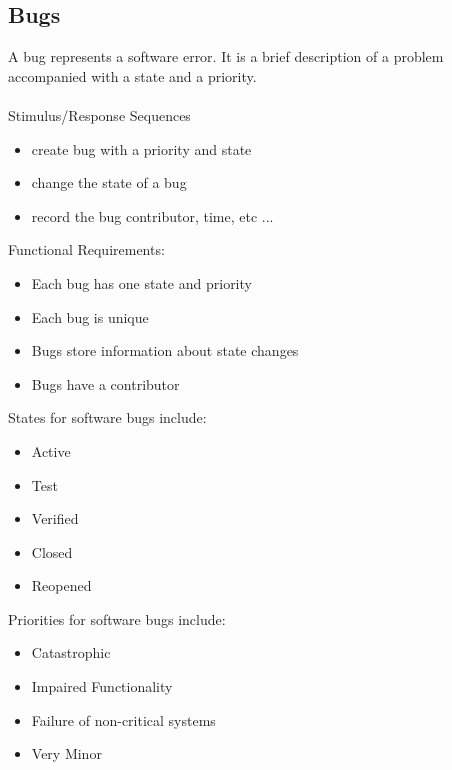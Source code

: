 \documentclass{article}
\begin{document}
\subsection{Bugs}
A bug represents a software error. It is a brief description of a problem accompanied with a state and a priority.
\\ \\
Stimulus/Response Sequences
\begin{itemize}
\item create bug with a priority and state
\item change the state of a bug
\item record the bug contributor, time, etc ...
\end{itemize}
Functional Requirements:
\begin{itemize}
\item Each bug has one state and priority
\item Each bug is unique
\item Bugs store information about state changes
\item Bugs have a contributor
\end{itemize}
States for software bugs include:
\begin{itemize}
\item Active
\item Test
\item Verified
\item Closed
\item Reopened
\end{itemize}
Priorities for software bugs include:
\begin{itemize}
\item Catastrophic
\item Impaired Functionality
\item Failure of non-critical systems
\item Very Minor
\end{itemize}
\parencite{ibm20}
\end{document}
